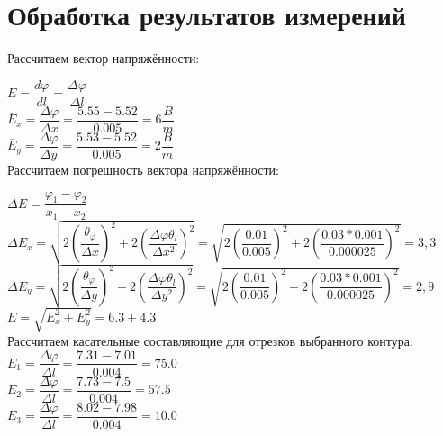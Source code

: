 \section*{Обработка результатов измерений}

Рассчитаем вектор напряжённости:

$ 
E = \dfrac{d\varphi}{dl} = 
\dfrac{\varDelta \varphi}{\varDelta l}
$\\

$ 
\overline E_x =
\dfrac{\varDelta \varphi}{\varDelta x} =
\dfrac{5.55 - 5.52}{0.005} =
6 \dfrac{B}{m}
$\\

$ 
\overline E_y =
\dfrac{\varDelta \varphi}{\varDelta y} =
\dfrac{5.53 - 5.52}{0.005} =
2 \dfrac{B}{m}
$\\

Рассчитаем погрешность вектора напряжённости:

$ 
\varDelta E = 
\dfrac{\varphi_1 - \varphi_2}{x_1 - x_2}
$\\

$ 
\varDelta E_x = 
\sqrt{
    2(\dfrac{\theta_\varphi}{\varDelta x})^2 + 
    2(\dfrac{\varDelta \varphi \theta_l}{\varDelta x ^2})^2
} = 
\sqrt{
    2(\dfrac{0.01}{0.005})^2 + 
    2(\dfrac{0.03 * 0.001}{0.000025})^2
} = 
3,3
$\\

$ 
\varDelta E_y = 
\sqrt{
    2(\dfrac{\theta_\varphi}{\varDelta y})^2 + 
    2(\dfrac{\varDelta \varphi \theta_l}{\varDelta y ^2})^2
} = 
\sqrt{
    2(\dfrac{0.01}{0.005})^2 + 
    2(\dfrac{0.03 * 0.001}{0.000025})^2
} = 
2,9
$\\

$ 
E = 
\sqrt{
    E_x^2 + E_y^2 
} = 6.3 \pm 4.3
$\\

Рассчитаем касательные составляющие для отрезков выбранного контура:\\ 

$
E_{1} = 
\dfrac{\varDelta \varphi}{\varDelta l} =
\dfrac{7.31 - 7.01}{0.004} = 
75.0
$\\


$
E_{2} = 
\dfrac{\varDelta \varphi}{\varDelta l} =
\dfrac{7.73 - 7.5}{0.004} = 
57.5
$\\


$
E_{3} = 
\dfrac{\varDelta \varphi}{\varDelta l} =
\dfrac{8.02 - 7.98}{0.004} = 
10.0
$\\


